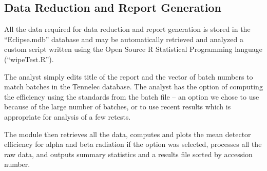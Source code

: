 \documentclass[letterpaper,12pt]{article}
\begin{document}
\subsection*{Data Reduction and Report Generation}

All the data required for data reduction and report generation is
stored in the ``Eclipse.mdb'' database and may be automatically
retrieved and analyzed a custom script written using the Open Source
R Statistical Programming language (``wipeTest.R'').

The analyst simply edits title of the report and the vector of batch
numbers to match batches in the Tennelec database. The analyst has the
option of computing the efficiency using the standards from the batch
file -- an option we chose to use because of the large number of batches,
or to use recent results which is appropriate for analysis of a few
retests. 

The module then retrieves all the data, computes and plots the mean detector
efficiency for alpha and beta radiation if the option was selected,
processes all the raw data, and outputs summary statistics and a
results file sorted by accession number.
\end{document}
